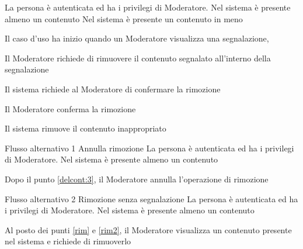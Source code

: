 {}
{La persona è autenticata ed ha i privilegi di Moderatore. Nel sistema è presente almeno un \gls{contenuto}}
{Nel sistema è presente un \gls{contenuto} in meno}
{\begin{enumCU}
	\item Il caso d'uso ha inizio quando un Moderatore visualizza una segnalazione, \label{rim}
	\item Il Moderatore richiede di rimuovere il contenuto segnalato all'interno della segnalazione\label{rim2}
	\item Il sistema richiede al Moderatore di confermare la rimozione\label{delcont:3}
	\item Il Moderatore conferma la rimozione 
	\item Il sistema rimuove il contenuto inappropriato
\end{enumCU}}
%
{Flusso alternativo 1}%
{Annulla rimozione}%
{La persona è autenticata ed ha i privilegi di Moderatore. Nel sistema è presente almeno un \gls{contenuto}}
{\postNulle}%
{\begin{enumCU}
		\item Dopo il punto \ref{delcont:3}, il Moderatore annulla l'operazione di rimozione
\end{enumCU}}%
%
{Flusso alternativo 2}%
{Rimozione senza segnalazione}%
{La persona è autenticata ed ha i privilegi di Moderatore. Nel sistema è presente almeno un \gls{contenuto}}
{\postNulle}%
{\begin{enumCU}
		\item Al posto dei punti \ref{rim} e \ref{rim2}, il Moderatore visualizza un \gls{contenuto} presente nel sistema e richiede di rimuoverlo
\end{enumCU}}%


